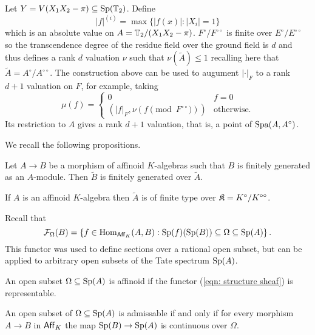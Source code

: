 \begin{example}
    Let $Y=V(X_{1}X_{2}-\pi)\subseteq\mathrm{Sp}(\mathbb{T}_{2})$. Define 
    $$|f|^{(i)}=\max\{|f(x)|:|X_{i}|=1\}$$ 
    which is an absolute value on $A=\mathbb{T}_{2}/(X_{1}X_{2}-\pi)$. $F^{\circ}/F^{\circ\circ}$ is finite over $E^{\circ}/E^{\circ\circ}$ so the transcendence degree of the residue field over the ground field is $d$ and thus defines a rank $d$ valuation $\nu$ such that $\nu(\widetilde{A})\leq 1$ recalling here that $\widetilde{A}=A^{\circ}/A^{\circ\circ}$. The construction above can be used to augument $|\cdot|_{F}$ to a rank $d+1$ valuation on $F$, for example, taking 
    $$\mu(f)=\begin{cases}
        0 & f=0 \\ (|f|_{F},\nu(f\pmod{F^{\circ\circ}})) & \text{otherwise.}
    \end{cases}$$
    Its restriction to $A$ gives a rank $d+1$ valuation, that is, a point of $\mathrm{Spa}(A,A^{\circ})$. 
\end{example}
We recall the following propositions. 
\begin{proposition}
    Let $A\to B$ be a morphism of affinoid $K$-algebras such that $B$ is finitely generated as an $A$-module. Then $\widetilde{B}$ is finitely generated over $\widetilde{A}$. 
\end{proposition}
\begin{corollary}
    If $A$ is an affinoid $K$-algebra then $\widetilde{A}$ is of finite type over $\mathfrak{K}=K^{\circ}/K^{\circ\circ}$.
\end{corollary} %
Recall that 
\begin{equation}\label{eqn: structure sheaf}
    \mathcal{F}_{\Omega}(B)=\left\{f\in\mathrm{Hom}_{\mathsf{Aff}_{K}}(A,B):\mathrm{Sp}(f)(\mathrm{Sp}(B))\subseteq\Omega\subseteq\mathrm{Sp}(A)\right\}.
\end{equation}
This functor was used to define sections over a rational open subset, but can be applied to arbitrary open subsets of the Tate spectrum $\mathrm{Sp}(A)$. 
\begin{definition}\label{def: affinoid open subset}
    An open subset $\Omega\subseteq\mathrm{Sp}(A)$ is affinoid if the functor (\ref{eqn: structure sheaf}) is representable.
\end{definition}
\begin{definition}\label{def: admissable open subset}
    An open subset of $\Omega\subseteq\mathrm{Sp}(A)$ is admissable if and only if for every morphism $A\to B$ in $\mathsf{Aff}_{K}$ the map $\mathrm{Sp}(B)\to\mathrm{Sp}(A)$ is continuous over $\Omega$. 
\end{definition}
